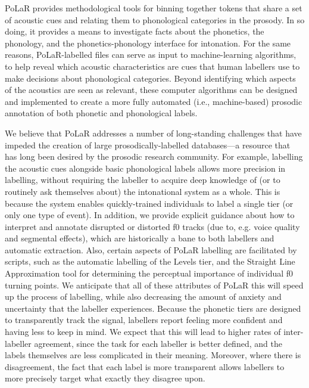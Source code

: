 \documentclass[11pt, twoside]{memoir}
\begin{document}
PoLaR provides methodological tools for binning together tokens that share a set of acoustic cues and relating them to phonological categories in the prosody. In so doing, it provides a means to investigate facts about the phonetics, the phonology, and the phonetics-phonology interface for intonation. For the same reasons, PoLaR-labelled files can serve as input to machine-learning algorithms, to help reveal which acoustic characteristics are cues that human labellers use to make decisions about phonological categories. Beyond identifying which aspects of the acoustics are seen as relevant, these computer algorithms can be designed and implemented to create a more fully automated (i.e., machine-based) prosodic annotation of both phonetic and phonological labels. 

We believe that PoLaR addresses a number of long-standing challenges that have impeded the creation of large prosodically-labelled databases---a resource that has long been desired by the prosodic research community.  For example, labelling the acoustic cues alongside basic phonological labels allows more precision in labelling, without requiring the labeller to acquire deep knowledge of (or to routinely ask themselves about) the intonational system as a whole. This is because the system enables quickly-trained individuals to label a single tier (or only one type of event). In addition, we provide explicit guidance about how to interpret and annotate disrupted or distorted f0 tracks (due to, e.g. voice quality and segmental effects), which are historically a bane to both labellers and automatic extraction.  Also, certain aspects of PoLaR labelling are facilitated by scripts, such as the automatic labelling of the Levels tier, and the Straight Line Approximation tool for determining the perceptual importance of individual f0 turning points. We anticipate that all of these attributes of PoLaR this will speed up the process of labelling, while also decreasing the amount of anxiety and uncertainty that the labeller experiences. Because the phonetic tiers are designed to transparently track the signal, labellers report feeling more confident and having less to keep in mind. We expect that this will lead to higher rates of inter-labeller agreement, since the task for each labeller is better defined, and the labels themselves are less complicated in their meaning. Moreover, where there is disagreement, the fact that each label is more transparent allows labellers to more precisely target what exactly they disagree upon. 
\end{document}
